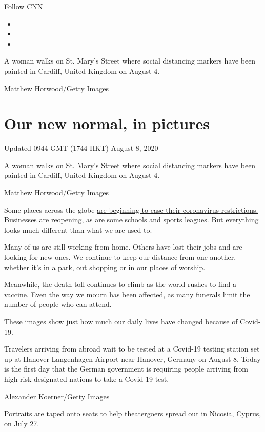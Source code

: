 Follow CNN

\begin{itemize}
\item
\item
\item
\end{itemize}

A woman walks on St. Mary's Street where social distancing markers have
been painted in Cardiff, United Kingdom on August 4.

Matthew Horwood/Getty Images

\hypertarget{our-new-normal-in-pictures}{%
\section{Our new normal, in pictures}\label{our-new-normal-in-pictures}}

Updated 0944 GMT (1744 HKT) August 8, 2020

A woman walks on St. Mary's Street where social distancing markers have
been painted in Cardiff, United Kingdom on August 4.

Matthew Horwood/Getty Images

Some places across the globe
\href{http://www.cnn.com/2020/04/24/world/gallery/coronavirus-after-lockdown/index.html}{are
beginning to ease their coronavirus restrictions.} Businesses are
reopening, as are some schools and sports leagues. But everything looks
much different than what we are used to.

Many of us are still working from home. Others have lost their jobs and
are looking for new ones. We continue to keep our distance from one
another, whether it's in a park, out shopping or in our places of
worship.

Meanwhile, the death toll continues to climb as the world rushes to find
a vaccine. Even the way we mourn has been affected, as many funerals
limit the number of people who can attend.

These images show just how much our daily lives have changed because of
Covid-19.

Travelers arriving from abroad wait to be tested at a Covid-19 testing
station set up at Hanover-Langenhagen Airport near Hanover, Germany on
August 8. Today is the first day that the German government is requiring
people arriving from high-risk designated nations to take a Covid-19
test.

Alexander Koerner/Getty Images

Portraits are taped onto seats to help theatergoers spread out in
Nicosia, Cyprus, on July 27.

